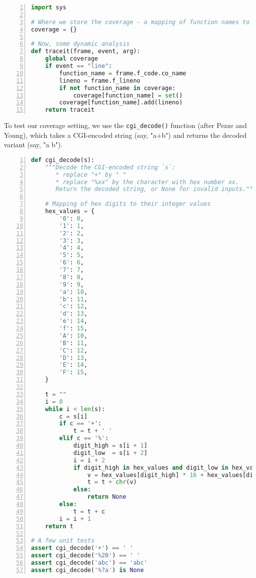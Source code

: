 \documentclass[10pt,parskip=half,
	toc=sectionentrywithdots,
	bibliography=totocnumbered,
	captions=tableheading,numbers=noendperiod]{scrartcl}
\begin{document}
\begin{lstlisting}[language=Python,numbers=left,xleftmargin=20pt,xrightmargin=5pt,belowskip=5pt,aboveskip=5pt]
import sys

# Where we store the coverage - a mapping of function names to sets of lines
coverage = {}

# Now, some dynamic analysis
def traceit(frame, event, arg):
    global coverage
    if event == "line":
        function_name = frame.f_code.co_name
        lineno = frame.f_lineno
        if not function_name in coverage:
            coverage[function_name] = set()
        coverage[function_name].add(lineno)
    return traceit
\end{lstlisting}

To test our coverage setting, we use the \texttt{cgi\_decode()} function
(after Pezze and Young), which takes a CGI-encoded string (say, "a+b")
and returns the decoded variant (say, "a b").

\begin{lstlisting}[language=Python,numbers=left,xleftmargin=20pt,xrightmargin=5pt,belowskip=5pt,aboveskip=5pt]
def cgi_decode(s):
    """Decode the CGI-encoded string `s`:
       * replace "+" by " "
       * replace "%xx" by the character with hex number xx.
       Return the decoded string, or None for invalid inputs."""

    # Mapping of hex digits to their integer values
    hex_values = {
        '0': 0,
        '1': 1,
        '2': 2,
        '3': 3,
        '4': 4,
        '5': 5,
        '6': 6,
        '7': 7,
        '8': 8,
        '9': 9,
        'a': 10,
        'b': 11,
        'c': 12,
        'd': 13,
        'e': 14,
        'f': 15,
        'A': 10,
        'B': 11,
        'C': 12,
        'D': 13,
        'E': 14,
        'F': 15,
    }

    t = ""
    i = 0
    while i < len(s):
        c = s[i]
        if c == '+':
            t = t + ' '
        elif c == '%':
            digit_high = s[i + 1]
            digit_low  = s[i + 2]
            i = i + 2
            if digit_high in hex_values and digit_low in hex_values:
                v = hex_values[digit_high] * 16 + hex_values[digit_low]
                t = t + chr(v)
            else:
                return None
        else:
            t = t + c
        i = i + 1
    return t

# A few unit tests    
assert cgi_decode('+') == ' '
assert cgi_decode('%20') == ' '
assert cgi_decode('abc') == 'abc'
assert cgi_decode('%?a') is None

\end{lstlisting}
\end{document}

